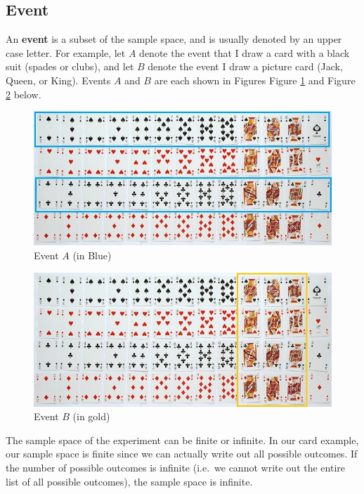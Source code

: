 \documentclass[
]{book}
\begin{document}
\subsection{Event}\label{event}

An \textbf{event} is a subset of the sample space, and is usually denoted by an upper case letter. For example, let \(A\) denote the event that I draw a card with a black suit (spades or clubs), and let \(B\) denote the event I draw a picture card (Jack, Queen, or King). Events \(A\) and \(B\) are each shown in Figures Figure \ref{fig:cardsA} and Figure \ref{fig:cardsB} below.

\begin{figure}
\centering
\includegraphics{images/02-cardsA.jpg}
\caption{\label{fig:cardsA}Event \(A\) (in Blue)}
\end{figure}

\begin{figure}
\centering
\includegraphics{images/02-cardsB.jpg}
\caption{\label{fig:cardsB}Event \(B\) (in gold)}
\end{figure}

The sample space of the experiment can be finite or infinite. In our card example, our sample space is finite since we can actually write out all possible outcomes. If the number of possible outcomes is infinite (i.e.~we cannot write out the entire list of all possible outcomes), the sample space is infinite.
\end{document}
